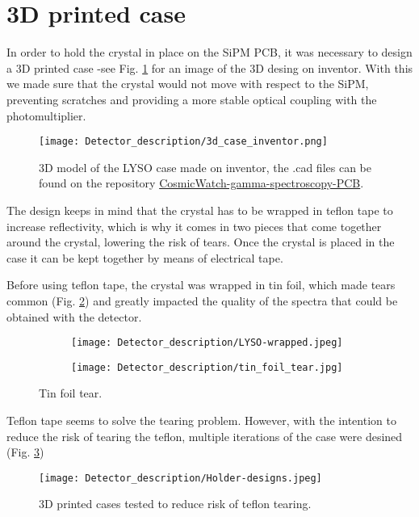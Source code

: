 \section{3D printed case}

In order to hold the crystal in place on the SiPM PCB, it was necessary to design a 3D printed case -see Fig. \ref{fig:3d_case_desing} for an image of the 3D desing on inventor. With this we made sure that the crystal would not move with respect to the SiPM, preventing scratches and providing a more stable optical coupling with the photomultiplier.

\begin{figure}[H]
    \centering
    \texttt{[image: Detector\_description/3d\_case\_inventor.png]}
    \caption{3D model of the LYSO case made on inventor, the .cad files can be found on the repository \href{https://github.com/anvargasl/CosmicWatch-gamma-spectroscopy-PCB}{CosmicWatch-gamma-spectroscopy-PCB}.}
    \label{fig:3d_case_desing}
\end{figure}

The design keeps in mind that the crystal has to be wrapped in teflon tape to increase reflectivity, which is why it comes in two pieces that come together around the crystal, lowering the risk of tears. Once the crystal is placed in the case it can be kept together by means of electrical tape.

Before using teflon tape, the crystal was wrapped in tin foil, which made tears common (Fig. \ref{fig:tin_foil_tear}) and greatly impacted the quality of the spectra that could be obtained with the detector. 

\begin{figure}[H]
    \centering
    \begin{subfigure}[t]{0.45\textwidth}
      \texttt{[image: Detector\_description/LYSO-wrapped.jpeg]}
    \end{subfigure}
    \begin{subfigure}[t]{0.45\textwidth}
      \texttt{[image: Detector\_description/tin\_foil\_tear.jpg]}
    \end{subfigure}
    \caption{\label{fig:tin_foil_tear}Tin foil tear.}
\end{figure}

Teflon tape seems to solve the tearing problem. However, with the intention to reduce the risk of tearing the teflon, multiple iterations of the case were desined (Fig. \ref{fig:3d_previous_desings})

\begin{figure}[H]
    \centering
    \texttt{[image: Detector\_description/Holder-designs.jpeg]}
    \caption{3D printed cases tested to reduce risk of teflon tearing.}
    \label{fig:3d_previous_desings}
\end{figure}
